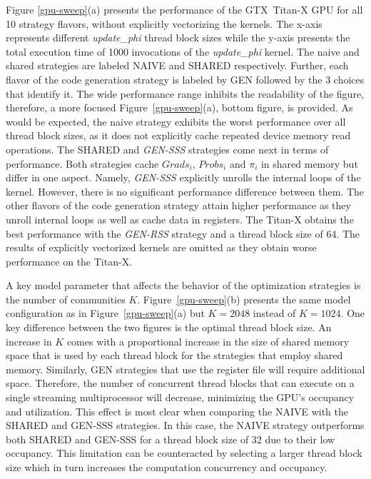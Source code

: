 Figure \ref{gpu-sweep}(a) presents the performance of the GTX~\mbox{Titan-X} GPU
for all 10 strategy flavors, without explicitly vectorizing the kernels. The
x-axis represents different \textit{update\_phi} thread block sizes while the y-axis presents
the total execution time of 1000 invocations of the \textit{update\_phi} kernel. The
naive and shared strategies are labeled NAIVE and SHARED respectively. Further,
each flavor of the code generation strategy is labeled by GEN followed by the 3
choices that identify it.
%
The wide performance range inhibits the readability of the figure,
therefore, a more focused Figure~\ref{gpu-sweep}(a), bottom figure, is provided. As would
be expected, the naive strategy exhibits the worst performance over all
thread block
sizes, as it does not explicitly cache repeated device memory read operations.
The SHARED and \textit{GEN-SSS} strategies come next in terms of performance.
Both strategies cache $Grads_i$, $Probs_i$ and $\pi_i$ in shared memory but
differ in one aspect. Namely, \textit{GEN-SSS} explicitly unrolls the internal
loops of the kernel. However, there is no significant performance difference
between them. The other flavors of the code generation strategy attain higher
performance as they unroll internal loops as well as cache data in
registers. The \mbox{Titan-X} obtains the best performance with the \textit{GEN-RSS}
strategy and a thread block size of 64. The results of explicitly vectorized kernels
are omitted as they obtain worse performance on the \mbox{Titan-X}.

A key model parameter that affects the behavior of the optimization strategies
is the number of communities $K$. Figure~\ref{gpu-sweep}(b) presents the
same model configuration as in Figure~\ref{gpu-sweep}(a) but $K=2048$
instead of $K=1024$. One key difference between the two figures is the optimal
thread block size. An increase in $K$ comes with a proportional increase in
the size of shared memory space that is used by each thread block for the
strategies that employ shared memory. Similarly, GEN strategies that use the
register file will require additional space. Therefore, the number of
concurrent thread blocks that can execute on a single streaming multiprocessor
will decrease, minimizing the GPU's occupancy and utilization. This effect is
most clear when comparing the NAIVE with the SHARED and GEN-SSS strategies. In
this case, the NAIVE strategy outperforms both SHARED and GEN-SSS for a
thread block
size of 32 due to their low occupancy. This limitation can be counteracted by
selecting a larger thread block size which in turn increases the computation
concurrency and occupancy.

